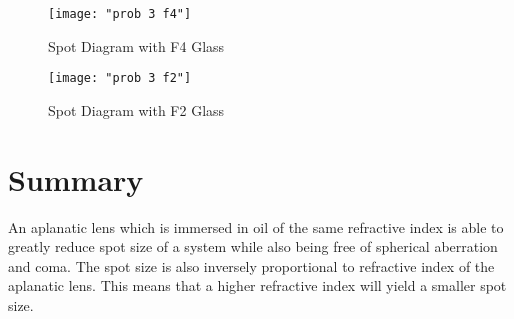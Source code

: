 \documentclass{article}
\begin{document}
\begin{figure}[H]
\texttt{[image: "prob 3 f4"]}
\centering
\caption{Spot Diagram with F4 Glass}
\centering
\end{figure}

\begin{figure}[H]
\texttt{[image: "prob 3 f2"]}
\centering
\caption{Spot Diagram with F2 Glass}
\centering
\end{figure}

\section{Summary}
An aplanatic lens which is immersed in oil of the same refractive index is able to greatly reduce spot size of a system while also being free of spherical aberration and coma. The spot size is also inversely proportional to refractive index of the aplanatic lens. This means that a higher refractive index will yield a smaller spot size.
\end{document}
